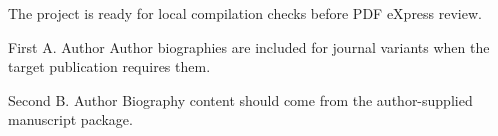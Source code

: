The project is ready for local compilation checks before PDF eXpress review.




\begin{IEEEbiographynophoto}{First A. Author}
Author biographies are included for journal variants when the target publication requires them.
\end{IEEEbiographynophoto}

\begin{IEEEbiographynophoto}{Second B. Author}
Biography content should come from the author-supplied manuscript package.
\end{IEEEbiographynophoto}


